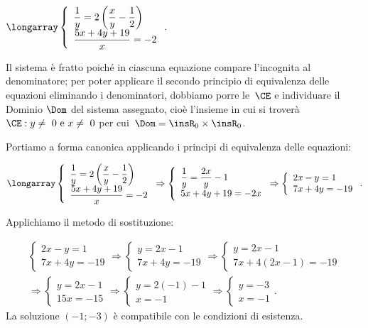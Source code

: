 \begin{exrig}
 \begin{esempio}
 $\longarray\left\{\begin{array}{l}
 \dfrac{1}{y}=2\left(\dfrac{x}{y}-\dfrac{1}{2}\right)\\
 \dfrac{5x+4y+19}{x}=-2\end{array}\right..$

 Il sistema è fratto poiché in ciascuna equazione compare
l'incognita al denominatore; per poter applicare il
secondo principio di equivalenza delle equazioni eliminando i
denominatori, dobbiamo porre le~$\CE$ e individuare il Dominio $\Dom$ del sistema
assegnato, cioè l'insieme in cui si troverà~$\CE: y\neq~0\text{ e }x\neq~0$ per
cui~$\Dom=\insR_{0}\times \insR_{0}$.

Portiamo a forma canonica applicando i principi di equivalenza delle
equazioni:

\begin{equation*}
{\longarray\left\{\begin{array}{l}
	  \dfrac{1}{y}=2\left(\dfrac{x}{y}-\dfrac{1}{2}\right)\\
	  \dfrac{5x+4y+19}{x}=-2\end{array}\right.\Rightarrow
 \left\{\begin{array}{l}
	  \dfrac{1}{y}=\dfrac{2x}{y}-1\\
	  5x+4y+19=-2x\end{array}\right.}\Rightarrow
 \left\{\begin{array}{l}
	  2x-y=1\\
	  7x+4y=-19\end{array}\right..
\end{equation*}

Applichiamo il metodo di sostituzione:

\begin{multline*}
\left\{\begin{array}{l}2x-y=1\\7x+4y=-19\end{array}\right.\Rightarrow
\left\{\begin{array}{l}y=2x-1\\7x+4y=-19\end{array}\right.\Rightarrow
\left\{\begin{array}{l}y=2x-1\\7x+4(2x-1)=-19\end{array}\right.
\\\Rightarrow
\left\{\begin{array}{l}y=2x-1\\15x=-15\end{array}\right.\Rightarrow
\left\{\begin{array}{l}y=2(-1)-1\\x=-1\end{array}\right.\Rightarrow
\left\{\begin{array}{l}y=-3\\x=-1\end{array}\right..
\end{multline*}
La soluzione $(-1;-3)$ è compatibile con le condizioni di esistenza.
\end{esempio}
 \end{exrig}

